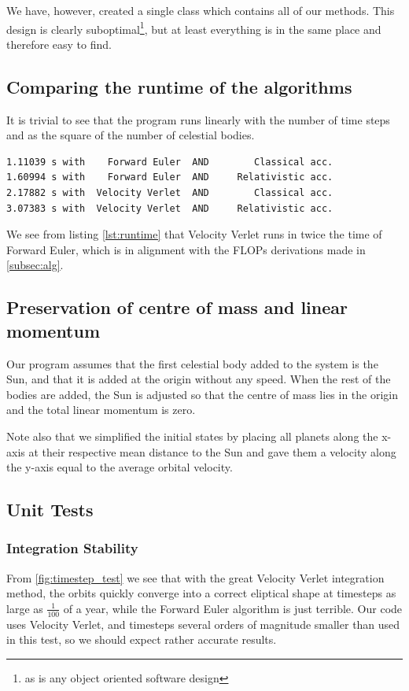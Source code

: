 \documentclass[a4paper]{article}
\begin{document}
We have, however, created a single class which contains all of our methods. This design is clearly suboptimal\footnote{as is any object oriented software design}, but at least everything is in the same place and therefore easy to find.

\subsection{Comparing the runtime of the algorithms}
It is trivial to see that the program runs linearly with the number of time steps and as the square of the number of celestial bodies.

\begin{lstlisting}[basicstyle=\footnotesize, frame=single, label={lst:runtime},caption=Runtime for various combinations of algorithms]
1.11039 s with    Forward Euler  AND        Classical acc.
1.60994 s with    Forward Euler  AND     Relativistic acc.
2.17882 s with  Velocity Verlet  AND        Classical acc.
3.07383 s with  Velocity Verlet  AND     Relativistic acc.
\end{lstlisting}

We see from listing \ref{lst:runtime} that Velocity Verlet runs in twice the time of Forward Euler, which is in alignment with the FLOPs derivations made in \vref{subsec:alg}.


\subsection{Preservation of centre of mass and linear momentum}
Our program assumes that the first celestial body added to the system is the Sun, and that it is added at the origin without any speed. When the rest of the bodies are added, the Sun is adjusted so that the centre of mass lies in the origin and the total linear momentum is zero.

Note also that we simplified the initial states by placing all planets along the x-axis at their respective mean distance to the Sun and gave them a velocity along the y-axis equal to the average orbital velocity.


\subsection{Unit Tests}
\subsubsection{Integration Stability}
From \vref{fig:timestep_test} we see that with the great Velocity Verlet integration method, the orbits quickly converge into a correct eliptical shape at timesteps as large as $\frac{1}{100}$ of a year, while the Forward Euler algorithm is just terrible. Our code uses Velocity Verlet, and timesteps several orders of magnitude smaller than used in this test, so we should expect rather accurate results.\\
\end{document}
